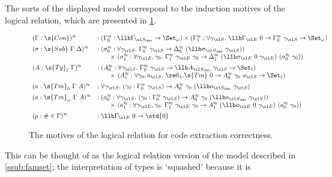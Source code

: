 The sorts of the displayed model correspond to the induction
motives of the logical relation, which are presented in \cref{fig:logrel}.
\begin{figure}[h]
{$$\begin{array}{ll}
  (\Gamma : \s{Con})^{\approx} &:
    (\Gamma^{\approx}_0 : \llb\Gamma_{\cl S_\Set} \to \Set_{\omega}) \times (\Gamma^{\approx}_1 : \forall \gamma_{\cl S}.\ \llb\Gamma_{\cl E}\ 0
    \to \Gamma^{\approx}_0\ \gamma_{\cl S} \to \Set_{\omega}) \\[0.5em]
  (\sigma : \s{Sub}\ \Gamma\ \Delta)^{\approx} &:
    (\sigma^{\approx}_0 : \forall \gamma_{\cl S}.\ \Gamma^{\approx}_0\ \gamma_{\cl S} \to \Delta^{\approx}_0\ (\llb\sigma_{\cl S_\Set}\ \gamma_{\cl S})) \\
    &\qquad \times\ (\sigma^{\approx}_1 : \forall \gamma_{\cl E},\gamma_0.\ \Gamma^{\approx}_1\ \gamma_{\cl E}\ \gamma_0
    \to \Delta^{\approx}_1\ (\llb\sigma_{\cl E}\ 0\ \gamma_{\cl E})\ (\sigma^{\approx}_0\ \gamma_0)) \\[0.5em]
  (A : \s{Ty}_\ell\ \Gamma)^{\approx} &:
    (A^{\approx}_0 : \forall \gamma_{\cl S}.\ \Gamma^{\approx}_0\ \gamma_{\cl S} \to \llb A_{\cl S_\Set}\ \gamma_{\cl S} \to \Set_{\ell}) \\
    &\qquad \times\ (A^{\approx}_1 : \forall \gamma_0,a_{\cl S}.\ \re 0_\lambda.\s{Tm}\ {0}
    \to A^{\approx}_0\ \gamma_0\ a_{\cl S} \to \Set_{\ell}) \\[0.5em]
  (a : \s{Tm}_0\ \Gamma\ A)^{\approx} &:
    \forall \gamma_{\cl S}.\ (\gamma_0 : \Gamma^{\approx}_0\ \gamma_{\cl S}) \to A^{\approx}_0\ \gamma_0\ (\llb a_{\cl S_\Set}\ \gamma_{\cl S}) \\[0.5em]
  (a : \s{Tm}_\omega\ \Gamma\ A)^{\approx} &:
    (a^{\approx}_0 : \forall \gamma_{\cl S}.\ (\gamma_0 : \Gamma^{\approx}_0\ \gamma_{\cl S}) \to A^{\approx}_0\ \gamma_0\ (\llb a_{\cl S_\Set}\ \gamma_{\cl S})) \\
    &\qquad \times\ (a^{\approx}_1 : \forall \gamma_{\cl E},\gamma_0.\ \Gamma^{\approx}_1\ \gamma_{\cl E}\ \gamma_0
    \to A^{\approx}_1\ (\llb a_{\cl E}\ 0\ \gamma_{\cl E})\ (a^{\approx}_0\ \gamma_0)) \\[0.5em]
  (p : \#\in \Gamma)^{\approx} &: \llb\Gamma_{\cl E}\ 0 \to \std{0}
\end{array}$$}
\caption{The motives of the logical relation for code extraction correctness.}
\label{fig:logrel}
\end{figure}
This can be thought of as the logical relation version of the model described in
\cref{ssub:famset}; the interpretation of types is `squashed' because it is
